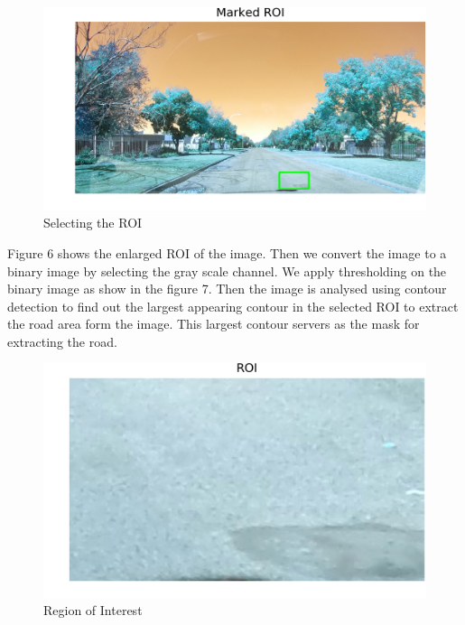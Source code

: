 \documentclass[journal]{IEEEtran}
\begin{document}
\begin{figure}[!htb]
\begin{center}
\includegraphics[scale=1]{Images/2_Marked_ROI.png}
\end{center}
\caption{Selecting the ROI}
\end{figure}

\vspace{0.5cm}

\noindent Figure 6 shows the enlarged ROI of the image. Then we convert the image to a binary image by selecting the gray scale channel. We apply thresholding on the binary image as show in the figure 7. Then the image is analysed using contour detection to find out the largest appearing contour in the selected ROI to extract the road area form the image. This largest contour servers as the mask for extracting the road. 

\begin{figure}[!htb]
\begin{center}
\includegraphics[scale=0.65]{Images/3_ROI.png}
\end{center}
\caption{Region of Interest}
\end{figure}
\end{document}
